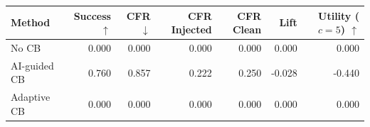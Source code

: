 \begin{tabular}{lrrrrrr}
\toprule
Method & Success $\uparrow$ & CFR $\downarrow$ & CFR Injected & CFR Clean & Lift & Utility ($c=5$) $\uparrow$ \\
\midrule
No CB & 0.000 & 0.000 & 0.000 & 0.000 & 0.000 & 0.000 \\
AI-guided CB & 0.760 & 0.857 & 0.222 & 0.250 & -0.028 & -0.440 \\
Adaptive CB & 0.000 & 0.000 & 0.000 & 0.000 & 0.000 & 0.000 \\
\bottomrule
\end{tabular}
